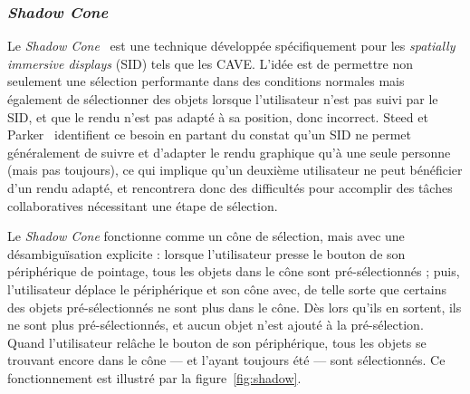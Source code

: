 	\subsubsection{\emph{Shadow Cone}}
	Le \emph{Shadow Cone}~\cite{steed20043d} est une technique développée spécifiquement pour les \emph{spatially immersive displays} (SID) tels que les CAVE. L'idée est de permettre non seulement une sélection performante dans des conditions \og normales \fg{} mais également de sélectionner des objets lorsque l'utilisateur n'est pas suivi par le SID, et que le rendu n'est pas adapté à sa position, donc incorrect. Steed et Parker~\cite{steed20043d} identifient ce besoin en partant du constat qu'un SID ne permet généralement de suivre et d'adapter le rendu graphique qu'à une seule personne (mais pas toujours\footnotemark), ce qui implique qu'un deuxième utilisateur ne peut bénéficier d'un rendu adapté, et rencontrera donc des difficultés pour accomplir des tâches collaboratives nécessitant une étape de sélection.
	
	
	Le \emph{Shadow Cone} fonctionne comme un cône de sélection, mais avec une désambiguïsation explicite : lorsque l'utilisateur presse le bouton de son périphérique de pointage, tous les objets dans le cône sont pré-sélectionnés ; puis, l'utilisateur déplace le périphérique et son cône avec, de telle sorte que certains des objets pré-sélectionnés ne sont plus dans le cône. Dès lors qu'ils en sortent, ils ne sont plus pré-sélectionnés, et aucun objet n'est ajouté à la pré-sélection. Quand l'utilisateur relâche le bouton de son périphérique, tous les objets se trouvant encore dans le cône --- et l'ayant toujours été --- sont sélectionnés. Ce fonctionnement est illustré par la figure~\ref{fig:shadow}.
	

